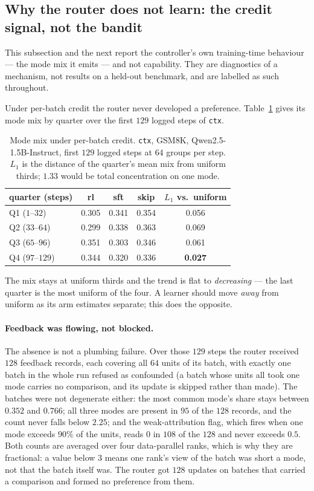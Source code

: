 \subsection{Why the router does not learn: the credit signal, not the bandit}
\label{sec:credit}

This subsection and the next report the controller's own training-time behaviour --- the mode
mix it emits --- and not capability. They are diagnostics of a mechanism, not results on a
held-out benchmark, and are labelled as such throughout.

Under per-batch credit the router never developed a preference. Table~\ref{tab:batchcredit}
gives its mode mix by quarter over the first $129$ logged steps of \texttt{ctx}.

\begin{table}[t]
\centering\small
\caption{Mode mix under per-batch credit. \texttt{ctx}, GSM8K, Qwen2.5-1.5B-Instruct, first
$129$ logged steps at $64$ groups per step. $L_1$ is the distance of the quarter's mean mix
from uniform thirds; $1.33$ would be total concentration on one mode.}
\label{tab:batchcredit}
\begin{tabular}{lcccc}
\toprule
quarter (steps) & rl & sft & skip & $L_1$ vs.\ uniform \\
\midrule
Q1 ($1$--$32$)   & 0.305 & 0.341 & 0.354 & 0.056 \\
Q2 ($33$--$64$)  & 0.299 & 0.338 & 0.363 & 0.069 \\
Q3 ($65$--$96$)  & 0.351 & 0.303 & 0.346 & 0.061 \\
Q4 ($97$--$129$) & 0.344 & 0.320 & 0.336 & \textbf{0.027} \\
\bottomrule
\end{tabular}
\end{table}

The mix stays at uniform thirds and the trend is flat to \emph{decreasing} --- the last
quarter is the most uniform of the four. A learner should move \emph{away} from uniform as its
arm estimates separate; this does the opposite.

\paragraph{Feedback was flowing, not blocked.} The absence is not a plumbing failure. Over
those $129$ steps the router received $128$ feedback records, each covering all $64$ units of
its batch, with exactly one batch in the whole run refused as confounded (a batch whose units
all took one mode carries no comparison, and its update is skipped rather than made). The
batches were not degenerate either: the most common mode's share stays between $0.352$ and
$0.766$; all three modes are present in $95$ of the $128$ records, and the count never falls
below $2.25$; and the weak-attribution flag, which fires when one mode exceeds $90\%$ of the
units, reads $0$ in $108$ of the $128$ and never exceeds $0.5$. Both counts are averaged over
four data-parallel ranks, which is why they are fractional: a value below $3$ means one
rank's view of the batch was short a mode, not that the batch itself was. The router got $128$
updates on batches that carried a comparison and formed no preference from them.

